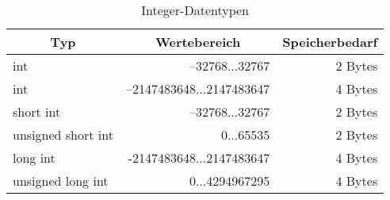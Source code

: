 \begin{table}[!ht]%
	\centering
	\caption{Integer-Datentypen}
	\label{tab:Integer-Datentypen}
		\begin{tabular}{@{}lrr@{}}
			\toprule
			\multicolumn{1}{c}{\textbf{Typ}} & \multicolumn{1}{c}{\textbf{Wertebereich}} & \multicolumn{1}{c}{\textbf{Speicherbedarf}} \\ \midrule
			int                              & –32768...32767                            & 2 Bytes                                     \\
			int                              & –2147483648...2147483647                  & 4 Bytes                                     \\
			short int                        & –32768...32767                            & 2 Bytes                                     \\
			unsigned short int               & 0...65535                                 & 2 Bytes                                     \\
			long int                         & -2147483648...2147483647                  & 4 Bytes                                     \\
			unsigned long int                & 0...4294967295                            & 4 Bytes                                     \\ \bottomrule
		\end{tabular}%
\end{table}